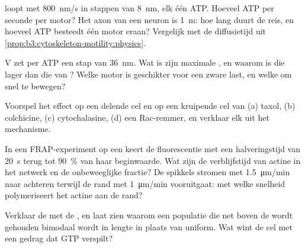 \begin{exercise}[$\star\star$]\label{exo:b3:cytoskeleton-motility:6}
 loopt met \qty{800}{nm/s} in stappen van \qty{8}{nm}, elk één
ATP. Hoeveel ATP per seconde per motor? Het axon van een neuron is
\qty{1}{m}: hoe lang duurt de reis, en hoeveel ATP besteedt één motor
eraan? Vergelijk met de diffusietijd uit
\cref{prop:b3:cytoskeleton-motility:physics}.
\end{exercise}

\begin{exercise}[$\star\star$]\label{exo:b3:cytoskeleton-motility:7}
 V zet per ATP een stap van \qty{36}{nm}. Wat is zijn maximale
, en waarom is die lager dan die van ? Welke
motor is geschikter voor een zware last, en welke om snel te bewegen?
\end{exercise}

\begin{exercise}[$\star\star$]\label{exo:b3:cytoskeleton-motility:8}
Voorspel het effect op een delende cel en op een kruipende cel van (a)
taxol, (b) colchicine, (c) cytochalasine, (d) een Rac-remmer, en
verklaar elk uit het mechanisme.
\end{exercise}

\begin{exercise}[$\star\star$]\label{exo:b3:cytoskeleton-motility:9}
In een FRAP-experiment op een  keert de fluorescentie met
een halveringstijd van \qty{20}{s} terug tot \qty{90}{\%} van haar
beginwaarde. Wat zijn de verblijfstijd van actine in het netwerk en de
onbeweeglijke fractie? De spikkels stromen met \qty{1.5}{\micro m/min}
naar achteren terwijl de rand met \qty{1}{\micro m/min} vooruitgaat: met
welke snelheid polymeriseert het actine aan de rand?
\end{exercise}

\begin{exercise}[$\star\star\star$]\label{exo:b3:cytoskeleton-motility:10}
Verklaar de  met de , en laat zien
waarom een populatie  die net boven de  wordt gehouden bimodaal wordt in lengte in plaats van
uniform. Wat wint de cel met een gedrag dat GTP verspilt?
\end{exercise}

